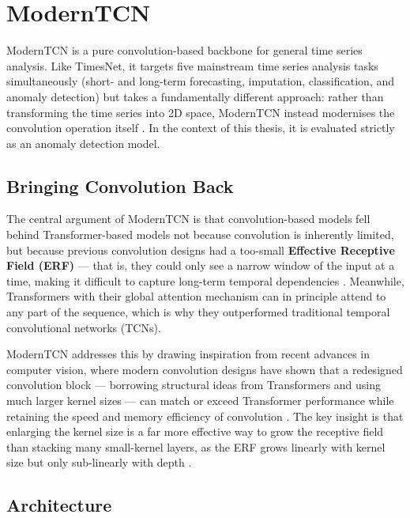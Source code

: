 \documentclass[twoside,11pt,openright]{report}
\begin{document}
\section{ModernTCN}

ModernTCN \citep{moderntcn2024} is a pure convolution-based backbone for general
time series analysis. Like
TimesNet, it targets five mainstream time series analysis tasks simultaneously 
(short- and long-term forecasting, imputation, classification, and anomaly detection) but takes a
fundamentally different approach: rather than transforming the time series into 2D
space, ModernTCN instead modernises the convolution operation itself
\citep{moderntcn2024}. In the context of this thesis, it is evaluated strictly as an
anomaly detection model.

\subsection{Bringing Convolution Back}

The central argument of ModernTCN is that convolution-based models fell behind
Transformer-based models not because convolution is inherently limited, but because
previous convolution designs had a too-small \textbf{Effective Receptive Field (ERF)}
--- that is, they could only see a narrow window of the input at a time, making it
difficult to capture long-term temporal dependencies \citep{moderntcn2024}. Meanwhile,
Transformers with their global attention mechanism can in principle attend to any
part of the sequence, which is why they outperformed traditional temporal convolutional
networks (TCNs).

ModernTCN addresses this by drawing inspiration from recent advances in computer vision,
where modern convolution designs \citep{liu2022convnext} have shown that a redesigned
convolution block --- borrowing structural ideas from Transformers and using much larger
kernel sizes --- can match or exceed Transformer performance while retaining the speed
and memory efficiency of convolution \citep{moderntcn2024}. The key insight is that
enlarging the kernel size is a far more effective way to grow the receptive field than
stacking many small-kernel layers, as the ERF grows linearly with kernel size but only
sub-linearly with depth \citep{moderntcn2024}.

\subsection{Architecture}
\end{document}
